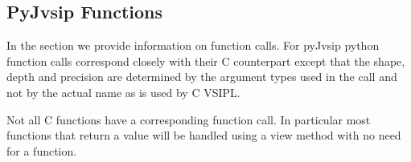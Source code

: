 \subsection*{PyJvsip Functions}
In the \pyjv {} section we provide information on function calls. For pyJvsip python function calls correspond closely with their C counterpart except that the shape, depth and precision are determined by the argument types used in the call and not by the actual name as is used by C VSIPL.

Not all C functions have a corresponding \pyjv function call. In particular most functions that return a value will be handled using a view method with no need for a function.
 


































